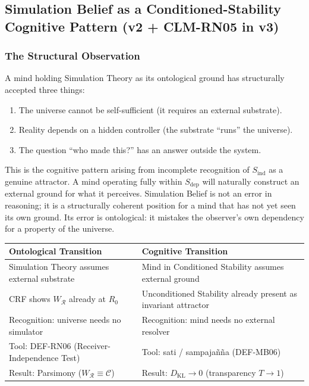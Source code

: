 \documentclass[12pt, a4paper]{article}
\begin{document}
\subsection{Simulation Belief as a Conditioned-Stability Cognitive
Pattern (v2 + CLM-RN05 in v3)}
\label{sec:sdep}

\subsubsection{The Structural Observation}

A mind holding Simulation Theory as its ontological ground has
structurally accepted three things:
\begin{enumerate}[leftmargin=*]
\item The universe cannot be self-sufficient (it requires an
  external substrate).
\item Reality depends on a hidden controller (the substrate
  ``runs'' the universe).
\item The question ``who made this?'' has an answer outside the
  system.
\end{enumerate}

This is the cognitive pattern arising from incomplete recognition
of $S_{\mathrm{ind}}$ as a genuine attractor. A mind operating
fully within $S_{\mathrm{dep}}$ will naturally construct an external
ground for what it perceives. Simulation Belief is not an error in
reasoning; it is a structurally coherent position for a mind that
has not yet seen its own ground. Its error is ontological: it
mistakes the observer's own dependency for a property of the universe.

\begin{formalbox}[title={The Parallel (Structural, Not Metaphorical)}]
\begin{center}
{\small
\renewcommand{\arraystretch}{1.40}
\begin{tabular}{p{5.5cm} p{6.5cm}}
\toprule
\textbf{Ontological Transition} & \textbf{Cognitive Transition}\\
\midrule
Simulation Theory assumes external substrate &
Mind in Conditioned Stability assumes external ground\\
CRF shows $W_{\mathcal{R}}$ already at $R_0$ &
Unconditioned Stability already present as invariant attractor\\
Recognition: universe needs no simulator &
Recognition: mind needs no external resolver\\
Tool: DEF-RN06 (Receiver-Independence Test) &
Tool: sati / sampajañña (DEF-MB06)\\
Result: Parsimony ($W_{\mathcal{R}} \equiv \mathcal{C}$) &
Result: $D_{\mathrm{KL}} \to 0$ (transparency $T \to 1$)\\
\bottomrule
\end{tabular}
}
\end{center}
\end{formalbox}
\end{document}
